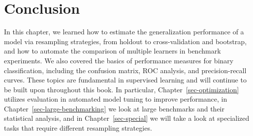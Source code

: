 \hypertarget{conclusion-1}{%
\section{Conclusion}\label{conclusion-1}}

In this chapter, we learned how to estimate the generalization
performance of a model via resampling strategies, from holdout to
cross-validation and bootstrap, and how to automate the comparison of
multiple learners in benchmark experiments. We also covered the basics
of performance measures for binary classification, including the
confusion matrix, ROC analysis, and precision-recall curves. These
topics are fundamental in supervised learning and will continue to be
built upon throughout this book. In particular,
Chapter~\ref{sec-optimization} utilizes evaluation in automated model
tuning to improve performance, in Chapter~\ref{sec-large-benchmarking}
we look at large benchmarks and their statistical analysis, and in
Chapter~\ref{sec-special} we will take a look at specialized tasks that
require different resampling strategies.

